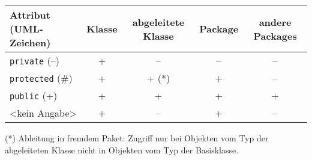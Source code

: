 \begin{center}
\bgroup
\def\arraystretch{1.2}
\begin{tabular}{|l|c|c|c|c|}
\hline
\textbf{Attribut (UML-Zeichen)} & \textbf{Klasse} & \textbf{abgeleitete
Klasse} & \textbf{Package} & \textbf{andere Packages} \\ \hline
\verb|private| (--)   &  +  & --    & -- & -- \\ \hline
\verb|protected| (\#) &  +  & + (*) &  + & -- \\ \hline
\verb|public| (+)     &  +  &  +    &  + & +  \\ \hline
<kein Angabe>         &  +  & --    &  + & -- \\ \hline
\end{tabular}
\egroup
\end{center}

(*) Ableitung in fremdem Paket: Zugriff nur bei Objekten vom Typ der
abgeleiteten Klasse nicht in Objekten vom Typ der Basisklasse.
